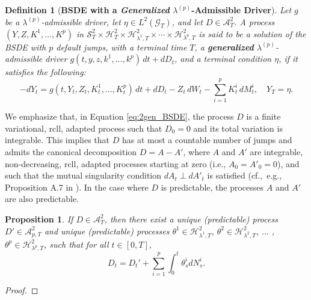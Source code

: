 \documentclass[11pt,a4paper]{article}
\numberwithin{equation}{section}
\theoremstyle{newPlain}
\newtheorem{proposition}[theorem]{Proposition}
\theoremstyle{newDefinition}
\newtheorem{definition}[theorem]{Definition}
\theoremstyle{newRemark}
\begin{document}
{\begin{definition}[\textbf{BSDE with a \emph{Generalized} $\lambda^{(p)}$-Admissible Driver}]\label{defintion:2_GenLambdaDriver}
    Let $g$ be a $\lambda^{(p)}$-admissible driver, let $\eta \in L^2(\mathcal{G}_T)$, and let $D \in \mathcal{A}_T^2$. A process $(Y, Z, K^1, \ldots, K^p)$ in $\mathcal{S}_T^2 \times \mathcal{H}_T^2 \times \mathcal{H}_{\lambda^1,T}^2 \times \cdots \times \mathcal{H}_{\lambda^p,T}^2$ is said to be a solution of the BSDE with $p$ default jumps, with a terminal time $T$, a \textbf{generalized} $\lambda^{(p)}$-admissible driver $g(t,y,z,k^1,\ldots,k^p)\,dt + dD_t$, and a terminal condition $\eta$, if it satisfies the following:
    \begin{equation}\label{eq:2gen_BSDE}
        -dY_t = g(t,Y_t, Z_t, K_t^1, \ldots, K_t^p)\,dt + dD_t - Z_t\,dW_t - \sum_{i=1}^p K_t^i\,dM_t^i, \quad Y_T = \eta.
    \end{equation}
\end{definition}

We emphasize that, in Equation \eqref{eq:2gen_BSDE}, the process $D$ is a finite variational, rcll, adapted process such that $D_0 = 0$ and its total variation is integrable. This implies that $D$ has at most a countable number of jumps and admits the canonical decomposition $D = A - A'$, where $A$ and $A'$ are integrable, non-decreasing, rcll, adapted processes starting at zero (i.e., $A_0 = A'_0 = 0$), and such that the mutual singularity condition $dA_t \perp dA'_t$ is satisfied (cf.,\ e.g., Proposition A.7 in \cite{dumitrescu2016generalized}). In the case where $D$ is predictable, the processes $A$ and $A'$ are also predictable.


\begin{proposition}\label{prop:OptionalpJumps}
    If $D\in\mathcal{A}_T^2$, then there exist a unique (predictable) process $D'\in\mathcal{A}_{p,T}^2$ and unique (predictable) processes $\theta^1\in\mathcal{H}_{\lambda^1,T}^2$, $\theta^2\in\mathcal{H}_{\lambda^2,T}^2$, $\ldots$ , $\theta^p\in\mathcal{H}_{\lambda^p,T}^2$, such that for all $t\in[0,T]$,
    \begin{equation}\label{eq:2_D_Optional}
        D_t = D_t' + \sum_{i=1}^p\int_0^t\theta_s^idN_s^i.
    \end{equation}
\end{proposition}

\begin{proof}


\end{proof}}
\end{document}

